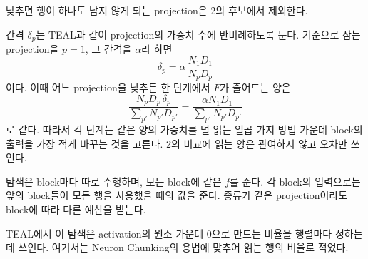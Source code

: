 낮추면 행이 하나도 남지 않게 되는 projection은 2의 후보에서 제외한다.

간격 $\delta_p$는 TEAL과 같이 projection의 가중치 수에 반비례하도록 둔다. 기준으로 삼는 projection을 $p=1$, 그 간격을 $\alpha$라 하면
\[
\delta_p=\alpha\,\frac{N_1D_1}{N_pD_p}
\]
이다. 이때 어느 projection을 낮추든 한 단계에서 $F$가 줄어드는 양은
\[
\boxed{
\displaystyle
\frac{N_pD_p\,\delta_p}{\sum_{p'}N_{p'}D_{p'}}
=\frac{\alpha N_1D_1}{\sum_{p'}N_{p'}D_{p'}}
}
\]
로 같다. 따라서 각 단계는 같은 양의 가중치를 덜 읽는 일곱 가지 방법 가운데 block의 출력을 가장 적게 바꾸는 것을 고른다. 2의 비교에 읽는 양은 관여하지 않고 오차만 쓰인다.

탐색은 block마다 따로 수행하며, 모든 block에 같은 $f$를 준다. 각 block의 입력으로는 앞의 block들이 모든 행을 사용했을 때의 값을 준다. 종류가 같은 projection이라도 block에 따라 다른 예산을 받는다.

TEAL에서 이 탐색은 activation의 원소 가운데 0으로 만드는 비율을 행렬마다 정하는 데 쓰인다. 여기서는 Neuron Chunking의 용법에 맞추어 읽는 행의 비율로 적었다.
